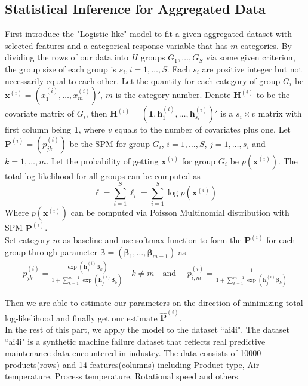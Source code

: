 \documentclass[12pt]{article}
\newcommand{\Pmat}{\mathbf{P}}
\newcommand{\wh}{\widehat}
\begin{document}
\subsection{Statistical Inference for Aggregated Data}\label{sec:model.est.inf}	
First introduce the "Logistic-like" model to fit a given aggregated dataset with selected features and a categorical response variable that has $m$ categories. 
By dividing the rows of our data into $H$ groups $G_1,\dots,G_{S}$ via some given criterion, the group size of each group is $s_i,i=1,\dots,S$. Each $s_i$ are positive integer but not necessarily equal to each other. Let the quantity for each category of group $G_i$ be $\boldsymbol{x}^{(i)} = (x_1^{(i)}, \dots, x_m^{(i)})'$, $m$ is the category number. Denote $\boldsymbol{H}^{(i)}$ to be the covariate matrix of $G_i$, then $\boldsymbol{H}^{(i)} = (\boldsymbol{1}, \boldsymbol{h}_{1}^{(i)},\dots,\boldsymbol{h}_{s_i}^{(i)})'$ is a $s_i \times v$ matrix with first column being $\boldsymbol{1}$, where $v$ equals to the number of covariates plus one. Let $\Pmat^{(i)} = (p_{jk}^{(i)})$ be the SPM for group $G_i$, $i = 1, \dots, S$, $j = 1,\dots ,s_i$ and $k = 1,\dots, m$. Let the probability of getting $\boldsymbol{x}^{(i)}$ for group $G_i$ be $p(\boldsymbol{x}^{(i)})$. The total log-likelihood for all groups can be computed as
\begin{equation*}
    \ell = \sum_{i=1}^{S}\ell_i = \sum_{i=1}^{S}\log p(\boldsymbol{x}^{(i)})
\end{equation*}
Where $p(\boldsymbol{x}^{(i)})$ can be computed via Poisson Multinomial distribution with SPM $\Pmat^{(i)}$.\\
Set category $m$ as baseline and use softmax function to form the $\Pmat^{(i)}$ for each group through parameter $\boldsymbol{\beta} = (\boldsymbol{\beta}_1, \dots, \boldsymbol{\beta}_{m-1})$ as
\begin{align*}
    p_{j k}^{(i)} = \frac{\exp{\left(\boldsymbol{h}_{j}^{(i)} \boldsymbol{\beta}_{k}\right)}}{1 + \sum_{k=1}^{m-1}\exp{\left( \boldsymbol{h}_{j}^{(i)} \boldsymbol{\beta}_{k} \right)}}
    \quad k \neq m \quad \text{and } \quad
    p_{i,m}^{(i)} = \frac{1}{1 + \sum_{k=1}^{m-1}\exp{\left( \boldsymbol{h}_{j}^{(i)} \boldsymbol{\beta}_{k} \right)}}
\end{align*}

Then we are able to estimate our parameters on the direction of minimizing total log-likelihood and finally get our estimate $\wh{\Pmat}^{(i)}$. \\
In the rest of this part, we apply the model to the dataset ``ai4i". The dataset ``ai4i" is a synthetic machine failure dataset that reflects real predictive maintenance data encountered in industry. The data consists of 10000 products(rows) and 14 features(columns) including Product type, Air temperature, Process temperature, Rotational speed and others.
\end{document}
